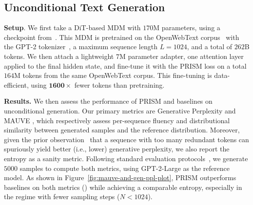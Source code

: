 \subsection{Unconditional Text Generation} \label{sec:owt}
\textbf{Setup}. We first take a DiT-based MDM with $170$M parameters, using a checkpoint from~\citep{sahoo2024simple}. This MDM is pretrained on the OpenWebText corpus~\citep{Gokaslan2019OpenWeb} with the GPT-2 tokenizer~\citep {radford2019language}, a maximum sequence length $L=1024$, and a total of $262$B tokens. We then attach a lightweight $7$M parameter adapter, one attention layer applied to the final hidden state, and fine-tune it with the PRISM loss on a total $164$M tokens from the same OpenWebText corpus. This fine-tuning is data-efficient, using $\mathbf{1600}\times$ fewer tokens than pretraining.

\textbf{Results.} We then assess the performance of PRISM and baselines on unconditional generation. Our primary metrics are Generative Perplexity and MAUVE \citep{pillutla2021mauve}, which respectively assess per-sequence fluency and distributional similarity between generated samples and the reference distribution. Moreover, given the prior observation~\citep{zheng2024masked} that a sequence with too many redundant tokens can spuriously yield better (i.e., lower) generative perplexity, we also report the entropy as a sanity metric. Following standard evaluation protocols~\citep{pillutla2021mauve, wang2025remasking}, we generate $5000$ samples to compute both metrics, using GPT-2-Large as the reference model. As shown in Figure~\ref{fig:mauve-and-gen-ppl-plot}, PRISM 
outperforms baselines on both metrics () while achieving a comparable entropy, especially in the regime with fewer sampling steps ($N<1024$).

